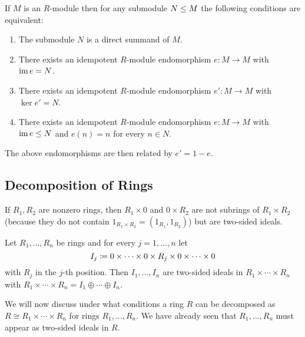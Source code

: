 

\begin{corollary}
  If $M$ is an $R$-module then for any submodule $N \leq M$ the following conditions are equivalent:
  \begin{enumerate}
    \item
      The submodule $N$ is a direct summand of $M$.
    \item
      There exists an idempotent $R$-module endomorphism $e \colon M \to M$ with $\operatorname{im} e = N$.
    \item
      There exists an idempotent $R$-module endomorphism $e' \colon M \to M$ with $\ker e' = N$.
    \item
      There exists an idempotent $R$-module endomorphism $e \colon M \to M$ with $\operatorname{im} e \leq N$ and $e(n) = n$ for every $n \in N$.
  \end{enumerate}
  The above endomorphisms are then related by $e' = 1 - e$.
\end{corollary}





\subsection{Decomposition of Rings}


\begin{fluff}
  If $R_1, R_2$ are nonzero rings, then $R_1 \times 0$ and $0 \times R_2$ are not subrings of $R_1 \times R_2$ (because they do not contain $1_{R_1 \times R_2} = (1_{R_1}, 1_{R_2})$) but are two-sided ideals.
\end{fluff}


\begin{lemma}
  Let $R_1, \dotsc, R_n$ be rings and for every $j = 1, \dotsc, n$ let
  \[
              I_j
    \coloneqq  0 \times \dotsb \times 0 \times R_j \times 0 \times \dotsb \times 0
  \]
  with $R_j$ in the $j$-th position.
  Then $I_1, \dotsc, I_n$ are two-sided ideals in $R_1 \times \dotsb \times R_n$ with $R_1 \times \dotsb \times R_n = I_1 \oplus \dotsb \oplus I_n$.
\end{lemma}




\begin{fluff}
  We will now discuss under what conditions a ring $R$ can be decomposed as $R \cong R_1 \times \dotsb \times R_n$ for rings $R_1, \dotsc, R_n$.
  We have already seen that $R_1, \dotsc, R_n$ must appear as two-sided ideals in $R$.
\end{fluff}


